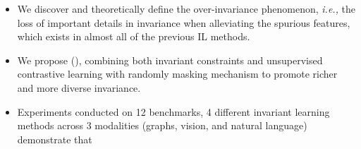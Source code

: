 \begin{itemize}
    \item We discover and theoretically define the over-invariance phenomenon,  \textit{i.e.,} the loss of important details in invariance when alleviating the spurious features, which exists in almost all of the previous IL methods. 
    \item We propose \oursfull (\ours), combining both invariant constraints and unsupervised contrastive learning with randomly masking mechanism to promote richer and more diverse invariance.
    \item Experiments conducted on 12 benchmarks, 4 different invariant learning methods across 3 modalities (graphs, vision, and natural language) demonstrate that 
\end{itemize}